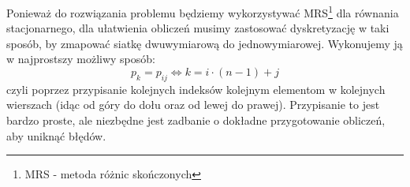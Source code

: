 \documentclass{article}
\begin{document}
Ponieważ do rozwiązania problemu będziemy
wykorzystywać MRS\footnote{MRS - metoda różnic skończonych} dla równania stacjonarnego, dla
ułatwienia obliczeń musimy zastosować dyskretyzację w taki sposób, by zmapować siatkę dwuwymiarową
do  jednowymiarowej. Wykonujemy ją w najprostszy możliwy sposób: \[p_k=p_{ij} \iff k=i\cdot (n-1)+j \]
czyli poprzez przypisanie kolejnych indeksów kolejnym elementom w kolejnych wierszach (idąc od góry 
do dołu oraz od lewej do prawej). Przypisanie to jest bardzo proste, ale niezbędne jest zadbanie o
 dokładne przygotowanie obliczeń, aby uniknąć błędów.
\end{document}
